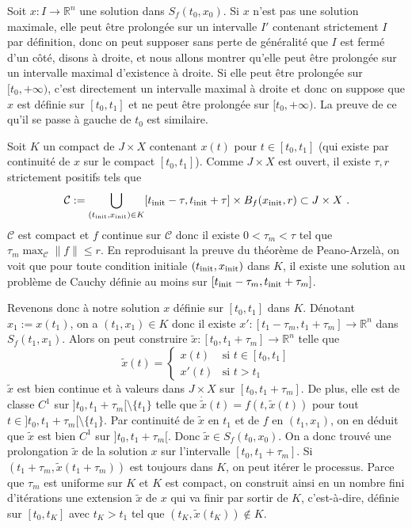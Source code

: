Soit \(x: I \to \mathbb{R}^n\) une solution dans \(S_f(t_0,x_0)\). Si
\(x\) n'est pas une solution maximale, elle peut être prolongée sur un
intervalle \(I'\) contenant strictement \(I\) par définition, donc on
peut supposer sans perte de généralité que \(I\) est fermé d'un côté,
disons à droite, et nous allons montrer qu'elle peut être prolongée sur
un intervalle maximal d'existence à droite. Si elle peut être prolongée
sur \([t_0,+\infty)\), c'est directement un intervalle maximal à droite
et donc on suppose que \(x\) est définie sur \([t_0,t_1]\) et ne peut
être prolongée sur \([t_0,+\infty)\). La preuve de ce qu'il se passe à
gauche de \(t_0\) est similaire.

Soit \(K\) un compact de \(J\times X\) contenant \(x(t)\) pour
\(t\in [t_0,t_1]\) (qui existe par continuité de \(x\) sur le compact
\([t_0,t_1]\)). Comme \(J\times X\) est ouvert, il existe \(\tau,r\)
strictement positifs tels que \[
\mathcal{C}:= \bigcup_{(t_{\rm init},x_{\rm init})\in K} [t_{\rm init}-\tau,t_{\rm init}+\tau] \times B_f(x_{\rm init},r) \subset J\times X \ .
\] \(\mathcal{C}\) est compact et \(f\) continue sur \(\mathcal{C}\)
donc il existe \(0<\tau_m<\tau\) tel que
\(\tau_m \max_\mathcal{C}\|f\| \leq r\). En reproduisant la preuve du
théorème de Peano-Arzelà, on voit que pour toute condition initiale
\((t_{\rm init},x_{\rm init})\) dans \(K\), il existe une solution au
problème de Cauchy définie au moins sur
\([t_{\rm init}-\tau_m,t_{\rm init}+\tau_m]\).

Revenons donc à notre solution \(x\) définie sur \([t_0,t_1]\) dans
\(K\). Dénotant \(x_1:= x(t_1)\), on a \((t_1,x_1)\in K\) donc il existe
\(x' : [t_1-\tau_m,t_1+\tau_m] \to \mathbb{R}^n\) dans \(S_f(t_1,x_1)\).
Alors on peut construire
\(\tilde{x}: [t_0,t_1+\tau_m] \to \mathbb{R}^n\) telle que \[
\tilde{x}(t) = 
\left\{
\begin{array}{ll}
x(t) & \text{si } t\in [t_0,t_1] \\
x'(t) & \text{si } t>t_1
\end{array}
\right.
\] \(\tilde{x}\) est bien continue et à valeurs dans \(J\times X\) sur
\([t_0,t_1+\tau_m]\). De plus, elle est de classe \(C^1\) sur
\(]t_0,t_1+\tau_m[\setminus \{ t_1\}\) telle que
\(\dot{\tilde{x}}(t) = f(t,\tilde{x}(t))\) pour tout
\(t\in ]t_0,t_1+\tau_m[\setminus \{ t_1\}\). Par continuité de
\(\tilde{x}\) en \(t_1\) et de \(f\) en \((t_1,x_1)\), on en déduit que
\(\tilde{x}\) est bien \(C^1\) sur \(]t_0,t_1+\tau_m[\). Donc
\(\tilde{x}\in S_f(t_0,x_0)\). On a donc trouvé une prolongation
\(\tilde{x}\) de la solution \(x\) sur l'intervalle
\([t_0,t_1+\tau_m]\). Si \((t_1+\tau_m,\tilde{x}(t_1+\tau_m))\) est
toujours dans \(K\), on peut itérer le processus. Parce que \(\tau_m\)
est uniforme sur \(K\) et \(K\) est compact, on construit ainsi en un
nombre fini d'itérations une extension \(\tilde{x}\) de \(x\) qui va
finir par sortir de \(K\), c'est-à-dire, définie sur \([t_0,t_K]\) avec
\(t_K>t_1\) tel que \((t_K,\tilde{x}(t_K))\notin K\).

